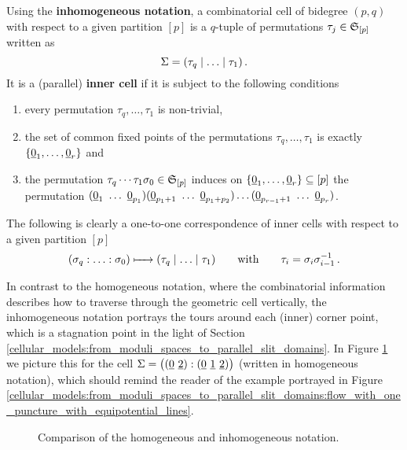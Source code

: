 \begin{defi}
    \label{cellular_models:parallel:inhomogeneous_notation}
    Using the {\bfseries inhomogeneous notation}, a combinatorial cell of bidegree $(p,q)$ with respect to a given partition $[p]$
    is a $q$-tuple of permutations $\tau_j \in \mathfrak S_{[p]}$ written as
    \[
        \Sigma = \inhomq \,.
    \]
    It is a (parallel) {\bfseries inner cell} if it is subject to the following conditions
    \begin{enumerate}
        \item every permutation $\tau_q, \ldots, \tau_1$ is non-trivial,
        \item the set of common fixed points of the permutations $\tau_q, \ldots, \tau_1$ is exactly $\{ \ul0_1, \ldots, \ul0_r\}$ and
        \item the permutation $\tau_q \cdots \tau_1 \sigma_0 \in \mathfrak S_{[p]}$ induces on $\{\ul0_1, \ldots, \ul0_r\} \subseteq [p]$ the permutation
            $(\ul0_1\ \ldots\ \ul0_{p_1})(\ul0_{p_1 + 1} \ \ldots\ \ul0_{p_1+p_2}) \ldots (\ul0_{p_{r-1} + 1} \ \ldots\ \ul0_{p_r})$.
    \end{enumerate}
\end{defi}
The following is clearly a one-to-one correspondence of inner cells with respect to a given partition $[p]$
\[
    \homogq \mapsto \inhomq \mspc{with}{20} \tau_i = \sigma_i\sigma_{i-1}^{-1} \,.
\]

In contrast to the homogeneous notation, where the combinatorial information describes how to traverse through the geometric cell vertically,
the inhomogeneous notation portrays the tours around each (inner) corner point, which is a stagnation point in the light of Section \ref{cellular_models:from_moduli_spaces_to_parallel_slit_domains}.
In Figure \ref{cellular_models:parallel:cell_comparison_notations} we picture this for the cell $\Sigma = \big( (\underline{\smash{0}}\ \underline{\smash{2}}): (\underline{\smash{0}}\ \underline{\smash{1}}\ \underline{\smash{2}}) \big)$ (written in homogeneous notation),
which should remind the reader of the example portrayed in Figure \ref{cellular_models:from_moduli_spaces_to_parallel_slit_domains:flow_with_one_puncture_with_equipotential_lines}.
\begin{figure}[ht]
\centering
{}
\caption{\label{cellular_models:parallel:cell_comparison_notations}Comparison of the homogeneous and inhomogeneous notation.}
\end{figure}

